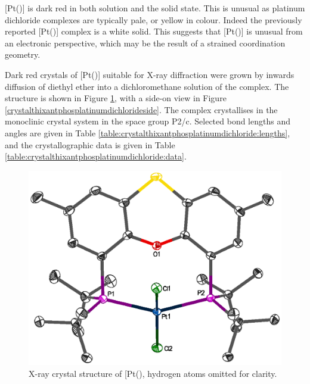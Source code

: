[Pt(\tButhixantphos)] is dark red in both  solution and the solid state.  This is unusual as platinum dichloride complexes are typically pale, or yellow in colour.  Indeed the previously reported [Pt(\Phxantphos)] complex is a white solid.\cite{Ohshima2009}  This suggests that [Pt(\tButhixantphos)] is unusual from an electronic perspective, which may be the result of a strained coordination geometry.  

Dark red crystals of [Pt(\tButhixantphos)] suitable for X-ray diffraction were grown by inwards diffusion of diethyl ether into a dichloromethane solution of the complex.  The structure is shown in Figure \ref{crystalthixantphosplatinumdichloride}, with a side-on view in Figure \ref{crystalthixantphosplatinumdichlorideside}.  The complex crystallises in the monoclinic crystal system in the space group P2/c.  Selected bond lengths and angles are given in Table \ref{table:crystalthixantphosplatinumdichloride:lengths}, and the crystallographic data is given in Table \ref{table:crystalthixantphosplatinumdichloride:data}.  

\begin{figure}[htbp]
\begin{center}
\vspace{0.5cm}
\includegraphics[scale=0.8]{../Figures/Crystalthixantphosplatinumdichloride.eps}
\caption[X-ray crystal structure of [Pt(\tButhixantphos)\ce{Cl2]}]{X-ray crystal structure of [Pt(\tButhixantphos)\ce{Cl2]}, hydrogen atoms omitted for clarity.}
\label{crystalthixantphosplatinumdichloride}
\end{center}
\end{figure}
\vspace{0.2cm}

